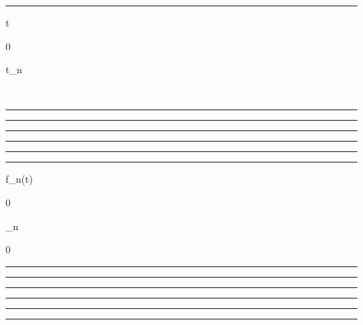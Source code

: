 \documentclass[]{article}
\begin{document}
\begin{center}\rule{3in}{0.4pt}\end{center}

t

0

t_n

\pi~

\begin{center}\rule{3in}{0.4pt}\end{center}

\begin{center}\rule{3in}{0.4pt}\end{center}

\begin{center}\rule{3in}{0.4pt}\end{center}

\begin{center}\rule{3in}{0.4pt}\end{center}

\begin{center}\rule{3in}{0.4pt}\end{center}

\begin{center}\rule{3in}{0.4pt}\end{center}

f_n(t)

0

\nearrow

\mu_n

\searrow

0

\begin{center}\rule{3in}{0.4pt}\end{center}

\begin{center}\rule{3in}{0.4pt}\end{center}

\begin{center}\rule{3in}{0.4pt}\end{center}

\begin{center}\rule{3in}{0.4pt}\end{center}

\begin{center}\rule{3in}{0.4pt}\end{center}

\begin{center}\rule{3in}{0.4pt}\end{center}
\end{document}
